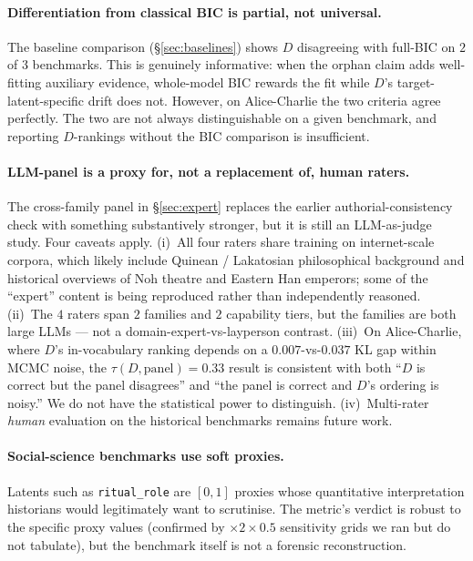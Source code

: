 \documentclass{article}
\begin{document}
\paragraph{Differentiation from classical BIC is partial, not
universal.} The baseline comparison (\S\ref{sec:baselines}) shows
$D$ disagreeing with full-BIC on $2$ of $3$ benchmarks. This is
genuinely informative: when the orphan claim adds well-fitting
auxiliary evidence, whole-model BIC rewards the fit while $D$'s
target-latent-specific drift does not. However, on Alice-Charlie
the two criteria agree perfectly. The two are not always
distinguishable on a given benchmark, and reporting $D$-rankings
without the BIC comparison is insufficient.

\paragraph{LLM-panel is a proxy for, not a replacement of, human raters.}
The cross-family panel in \S\ref{sec:expert} replaces the earlier
authorial-consistency check with something substantively stronger,
but it is still an LLM-as-judge study. Four caveats apply. (i)~All
four raters share training on internet-scale corpora, which likely
include Quinean / Lakatosian philosophical background and historical
overviews of Noh theatre and Eastern Han emperors; some of the
``expert'' content is being reproduced rather than independently
reasoned. (ii)~The $4$ raters span $2$ families and $2$ capability
tiers, but the families are both large LLMs --- not a
domain-expert-vs-layperson contrast. (iii)~On Alice-Charlie, where
$D$'s in-vocabulary ranking depends on a $0.007$-vs-$0.037$ KL gap
within MCMC noise, the $\tau(D, \text{panel}) = 0.33$ result is
consistent with both ``$D$ is correct but the panel disagrees''
and ``the panel is correct and $D$'s ordering is noisy.'' We do
not have the statistical power to distinguish. (iv)~Multi-rater
\emph{human} evaluation on the historical benchmarks remains
future work.

\paragraph{Social-science benchmarks use soft proxies.} Latents such
as \texttt{ritual\_role} are $[0, 1]$ proxies whose quantitative
interpretation historians would legitimately want to scrutinise. The
metric's verdict is robust to the specific proxy values (confirmed
by $\times 2 \times 0.5$ sensitivity grids we ran but do not
tabulate), but the benchmark itself is not a forensic reconstruction.
\end{document}
